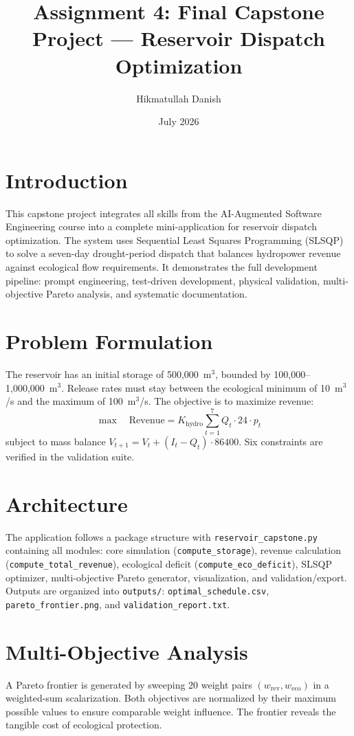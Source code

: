 \documentclass[12pt,a4paper]{article}
\title{Assignment 4: Final Capstone Project — Reservoir Dispatch Optimization}
\author{Hikmatullah Danish \quad 3125999089}
\date{July 2026}
\begin{document}
\maketitle

\section{Introduction}
This capstone project integrates all skills from the AI-Augmented Software Engineering course into a complete mini-application for reservoir dispatch optimization. The system uses Sequential Least Squares Programming (SLSQP) to solve a seven-day drought-period dispatch that balances hydropower revenue against ecological flow requirements. It demonstrates the full development pipeline: prompt engineering, test-driven development, physical validation, multi-objective Pareto analysis, and systematic documentation.

\section{Problem Formulation}
The reservoir has an initial storage of 500,000~m$^3$, bounded by 100,000--1,000,000~m$^3$. Release rates must stay between the ecological minimum of 10~m$^3$/s and the maximum of 100~m$^3$/s. The objective is to maximize revenue:
\begin{equation}
\max \quad \text{Revenue} = K_{\text{hydro}} \sum_{t=1}^{7} Q_t \cdot 24 \cdot p_t
\end{equation}
subject to mass balance $V_{t+1} = V_t + (I_t - Q_t)\cdot 86400$. Six constraints are verified in the validation suite.

\section{Architecture}
The application follows a package structure with \texttt{reservoir\_capstone.py} containing all modules: core simulation (\texttt{compute\_storage}), revenue calculation (\texttt{compute\_total\_revenue}), ecological deficit (\texttt{compute\_eco\_deficit}), SLSQP optimizer, multi-objective Pareto generator, visualization, and validation/export. Outputs are organized into \texttt{outputs/}: \texttt{optimal\_schedule.csv}, \texttt{pareto\_frontier.png}, and \texttt{validation\_report.txt}.

\section{Multi-Objective Analysis}
A Pareto frontier is generated by sweeping 20 weight pairs $(w_{\text{rev}}, w_{\text{eco}})$ in a weighted-sum scalarization. Both objectives are normalized by their maximum possible values to ensure comparable weight influence. The frontier reveals the tangible cost of ecological protection.
\end{document}

